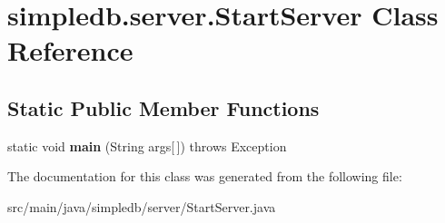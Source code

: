 \hypertarget{classsimpledb_1_1server_1_1StartServer}{}\section{simpledb.\+server.\+Start\+Server Class Reference}
\label{classsimpledb_1_1server_1_1StartServer}
\subsection*{Static Public Member Functions}
\begin{DoxyCompactItemize}
\item 
\mbox{\label{classsimpledb_1_1server_1_1StartServer_a84f528095f749103e2e99de9093a9310}} 
static void {\bfseries main} (String args\mbox{[}$\,$\mbox{]})  throws Exception 
\end{DoxyCompactItemize}


The documentation for this class was generated from the following file\+:\begin{DoxyCompactItemize}
\item 
src/main/java/simpledb/server/Start\+Server.\+java\end{DoxyCompactItemize}
